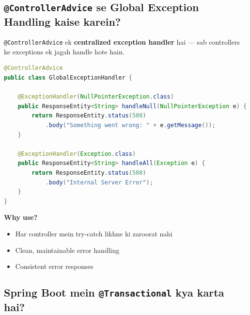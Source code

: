 \documentclass[12pt,a4paper]{article}
\begin{document}
\subsection{\texttt{@ControllerAdvice} se Global Exception Handling kaise karein?}

\begin{answerbox}
\texttt{@ControllerAdvice} ek \textbf{centralized exception handler} hai --- sab controllers ke exceptions ek jagah handle hote hain.
\begin{lstlisting}[language=Java]
@ControllerAdvice
public class GlobalExceptionHandler {

    @ExceptionHandler(NullPointerException.class)
    public ResponseEntity<String> handleNull(NullPointerException e) {
        return ResponseEntity.status(500)
            .body("Something went wrong: " + e.getMessage());
    }
    
    @ExceptionHandler(Exception.class)
    public ResponseEntity<String> handleAll(Exception e) {
        return ResponseEntity.status(500)
            .body("Internal Server Error");
    }
}
\end{lstlisting}
\textbf{Why use?}
\begin{itemize}
    \item Har controller mein try-catch likhne ki zaroorat nahi
    \item Clean, maintainable error handling
    \item Consistent error responses
\end{itemize}
\end{answerbox}

\subsection{Spring Boot mein \texttt{@Transactional} kya karta hai?}
\end{document}
